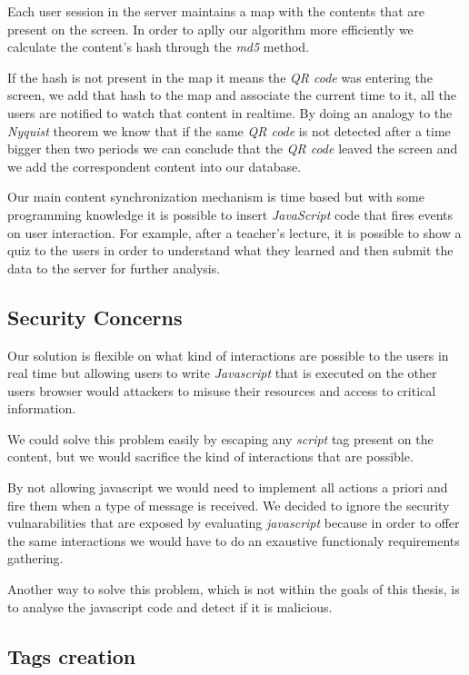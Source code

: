 	Each user session in the server maintains a map with the contents that are present on the screen. In order to aplly our algorithm more efficiently we calculate the content's hash through the \emph{md5} method.

	If the hash is not present in the map it means the \emph{QR code} was entering the screen, we add that hash to the map and associate the current time to it, all the users are notified to watch that content in realtime. By doing an analogy to the \emph{Nyquist} theorem we know that if the same \emph{QR code} is not detected after a time bigger then two periods we can conclude that the \emph{QR code} leaved the screen and we add the correspondent content into our database.

	Our main content synchronization mechanism is time based but with some programming knowledge it is possible to insert \emph{JavaScript} code that fires events on user interaction. For example, after a teacher's lecture, it is possible to show a quiz to the users in order to understand what they learned and then submit the data to the server for further analysis.

	\subsection{Security Concerns}

	Our solution is flexible on what kind of interactions are possible to the users in real time but allowing users to write \emph{Javascript} that is executed on the other users browser would attackers to misuse their resources and access to critical information.

	We could solve this problem easily by escaping any \emph{script} tag present on the content, but we would sacrifice the kind of interactions that are possible. 

	By not allowing javascript we would need to implement all actions a priori and fire them when a type of message is received. We decided to ignore the security vulnarabilities that are exposed by evaluating \emph{javascript} because in order to offer the same interactions we would have to do an exaustive functionaly requirements gathering.

	Another way to solve this problem, which is not within the goals of this thesis, is to analyse the javascript code and detect if it is malicious.


	\subsection{Tags creation}

